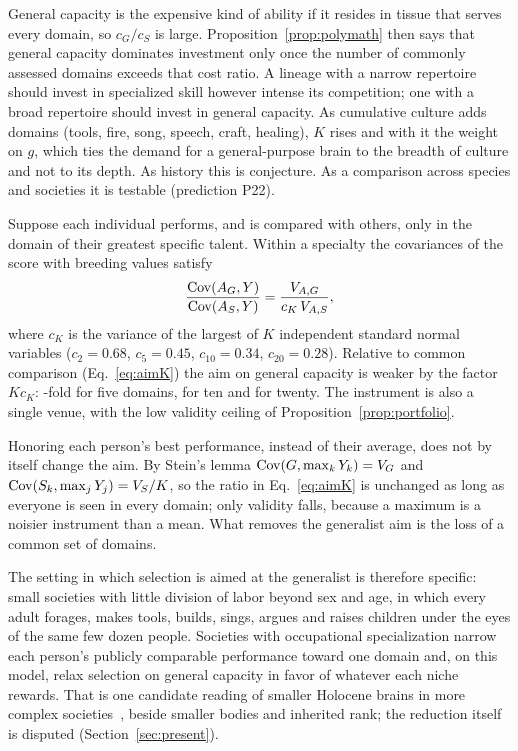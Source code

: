 General capacity is the expensive kind of ability if it resides in tissue that serves every domain, so $c_G/c_S$ is large.
Proposition~\ref{prop:polymath} then says that general capacity dominates investment only once the number of commonly assessed
domains exceeds that cost ratio. A lineage with a narrow repertoire should invest in specialized skill however intense its
competition; one with a broad repertoire should invest in general capacity. As cumulative culture adds domains (tools, fire,
song, speech, craft, healing), $K$ rises and with it the weight on $g$, which ties the demand for a general-purpose brain to
the breadth of culture and not to its depth. As history this is conjecture. As a comparison across species and societies it is
testable (prediction P22).

\begin{proposition}\label{prop:division}
Suppose each individual performs, and is compared with others, only in the domain of their greatest specific talent. Within a
specialty the covariances of the score with breeding values satisfy
\begin{equation}
\frac{\operatorname{Cov}(A_G,Y)}{\operatorname{Cov}(A_{S},Y)}=\frac{V_{A,G}}{c_K\,V_{A,S}},\label{eq:division}
\end{equation}
where $c_K$ is the variance of the largest of $K$ independent standard normal variables ($c_2=0.68$, $c_5=0.45$, $c_{10}=0.34$,
$c_{20}=0.28$). Relative to common comparison (Eq.~\ref{eq:aimK}) the aim on general capacity is weaker by the factor $Kc_K$:
\PolyDivFive-fold for five domains, \PolyDivTen{} for ten and \PolyDivTwenty{} for twenty. The instrument is also a single venue,
with the low validity ceiling of Proposition~\ref{prop:portfolio}.
\end{proposition}

\begin{remark}
Honoring each person's best performance, instead of their average, does not by itself change the aim. By Stein's lemma
$\operatorname{Cov}(G,\max_kY_k)=V_G$ and $\operatorname{Cov}(S_k,\max_jY_j)=V_S/K$, so the ratio in Eq.~\eqref{eq:aimK} is unchanged as long as everyone is
seen in every domain; only validity falls, because a maximum is a noisier instrument than a mean. What removes the generalist
aim is the loss of a common set of domains.
\end{remark}

The setting in which selection is aimed at the generalist is therefore specific: small societies with little division of labor
beyond sex and age, in which every adult forages, makes tools, builds, sings, argues and raises children under the eyes of the
same few dozen people. Societies with occupational specialization narrow each person's publicly comparable performance toward
one domain and, on this model, relax selection on general capacity in favor of whatever each niche rewards. That is one
candidate reading of smaller Holocene brains in more complex societies~\cite{desilva2021}, beside smaller bodies and inherited
rank; the reduction itself is disputed (Section~\ref{sec:present}).

